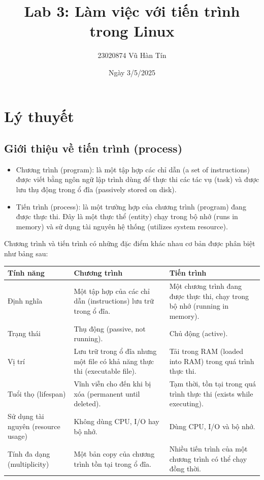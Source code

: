 \documentclass{article}
\title{Lab 3: Làm việc với tiến trình trong Linux
}
\author{23020874 Vũ Hàn Tín}
\date{Ngày 3/5/2025}
\begin{document}
\maketitle
\section{Lý thuyết}
\subsection{Giới thiệu về tiến trình (process)}
\begin{itemize}
    \item Chương trình (program): là một tập hợp các chỉ dẫn (a set of instructions) được viết bằng ngôn ngữ lập trình dùng để thực thi các
tác vụ (task) và được lưu thụ động trong ổ đĩa (passively stored on disk).
    \item Tiến trình (process): là một trường hợp của chương trình (program) đang được thực thi. Đây là một thực thể (entity) chạy trong bộ nhớ
(runs in memory) và sử dụng tài nguyên hệ thống (utilizes system resource).
\end{itemize}
Chương trình và tiến trình có những đặc điểm khác nhau cơ bản được phân biệt như bảng sau:
\begin{center}
    \begin{table}[h]
        \begin{tabularx}{\linewidth}{|l|X|X|}
        \hline
        \textbf{Tính năng} & \textbf{Chương trình} & \textbf{Tiến trình} \\ \hline
        Định nghĩa & Một tập hợp của các chỉ dẫn (instructions) lưu trữ trong ổ đĩa. & Một chương trình đang được thực thi, chạy trong bộ nhớ (running in memory).  \\ \hline
        Trạng thái & Thụ động (passive, not running). & Chủ động (active). \\ \hline
        Vị trí & Lưu trữ trong ổ đĩa nhưng một file có khả năng thực thi (executable file). &  Tải trong RAM (loaded into RAM) trong quá trình thực thi. \\ \hline
        Tuổi thọ (lifespan) & Vĩnh viễn cho đến khi bị xóa (permanent until deleted). & Tạm thời, tồn tại trong quá trình thực thi (exists while executing). \\ \hline
        Sử dụng tài nguyên (resource usage) & Không dùng CPU, I/O hay bộ nhớ. & Dùng CPU, I/O và bộ nhớ. \\ \hline
        Tính đa dạng (multiplicity) & Một bản copy của chương trình tồn tại trong ổ đĩa. & Nhiều tiến trình của một chương trình có thể chạy đồng thời. \\ \hline
        \end{tabularx}
        \end{table}
\end{center}
\end{document}
